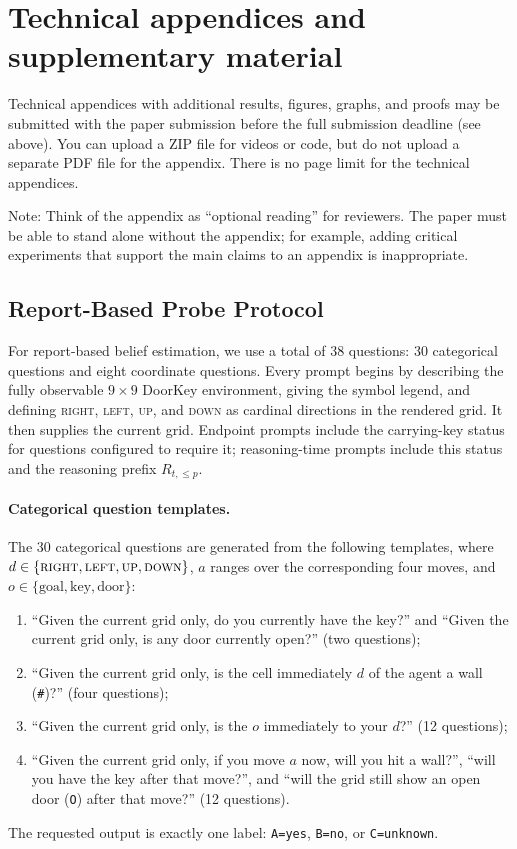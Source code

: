 \documentclass{article}
\begin{document}
\appendix

\section{Technical appendices and supplementary material}
Technical appendices with additional results, figures, graphs, and proofs may be submitted with the paper submission before the full submission deadline (see above). You can upload a ZIP file for videos or code, but do not upload a separate PDF file for the appendix. There is no page limit for the technical appendices. 

Note: Think of the appendix as ``optional reading'' for reviewers. The paper must be able to stand alone without the appendix; for example, adding critical experiments that support the main claims to an appendix is inappropriate. 
\subsection{Report-Based Probe Protocol}
\label{app:report-protocol}

For report-based belief estimation, we use a total of 38 questions: 30 categorical questions and eight coordinate questions.
Every prompt begins by describing the fully observable $9\times9$ DoorKey environment, giving the symbol legend, and defining \textsc{right}, \textsc{left}, \textsc{up}, and \textsc{down} as cardinal directions in the rendered grid.
It then supplies the current grid.
Endpoint prompts include the carrying-key status for questions configured to require it; reasoning-time prompts include this status and the reasoning prefix $R_{t,\leq p}$.

\paragraph{Categorical question templates.}
The 30 categorical questions are generated from the following templates, where $d\in\{\textsc{right},\textsc{left},\textsc{up},\textsc{down}\}$, $a$ ranges over the corresponding four moves, and $o\in\{\text{goal},\text{key},\text{door}\}$:
\begin{enumerate}
    \item ``Given the current grid only, do you currently have the key?'' and ``Given the current grid only, is any door currently open?'' (two questions);
    \item ``Given the current grid only, is the cell immediately $d$ of the agent a wall (\texttt{\#})?'' (four questions);
    \item ``Given the current grid only, is the $o$ immediately to your $d$?'' (12 questions);
    \item ``Given the current grid only, if you move $a$ now, will you hit a wall?'', ``will you have the key after that move?'', and ``will the grid still show an open door (\texttt{O}) after that move?'' (12 questions).
\end{enumerate}
The requested output is exactly one label: \texttt{A=yes}, \texttt{B=no}, or \texttt{C=unknown}.
\end{document}
